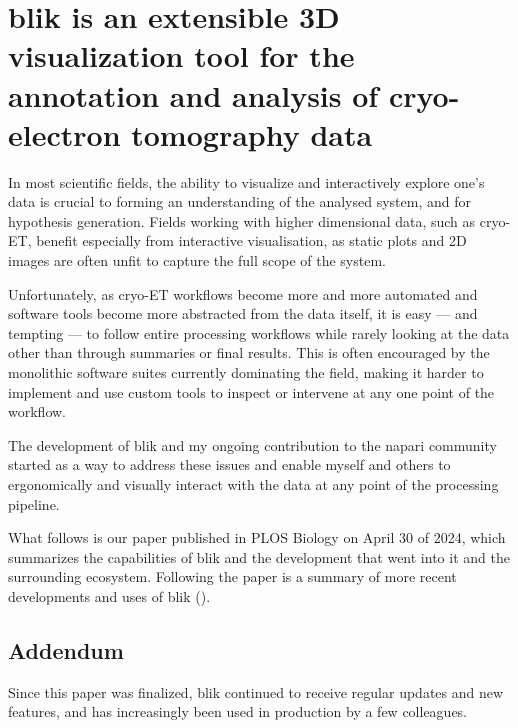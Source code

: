 \chapter[blik: a cryo-ET visualisation and analysis tool]{blik is an extensible 3D visualization tool for the annotation and analysis of cryo-electron tomography data}\label{blik}

In most scientific fields, the ability to visualize and interactively explore one's data is crucial to forming an understanding of the analysed system, and for hypothesis generation.
Fields working with higher dimensional data, such as cryo-ET, benefit especially from interactive visualisation, as static plots and 2D images are often unfit to capture the full scope of the system.

Unfortunately, as cryo-ET workflows become more and more automated and software tools become more abstracted from the data itself, it is easy --- and tempting --- to follow entire processing workflows while rarely looking at the data other than through summaries or final results.
This is often encouraged by the monolithic software suites currently dominating the field, making it harder to implement and use custom tools to inspect or intervene at any one point of the workflow.

The development of blik and my ongoing contribution to the napari community~\cite{thenaparicommunityNapariMultidimensionalImage2024} started as a way to address these issues and enable myself and others to ergonomically and visually interact with the data at any point of the processing pipeline.

What follows is our paper published in PLOS Biology on April 30 of 2024, which summarizes the capabilities of blik and the development that went into it and the surrounding ecosystem.
Following the paper is a summary of more recent developments and uses of blik ().

\localtableofcontents  %



\section{Addendum}\label{blik_addendum}

Since this paper was finalized, blik continued to receive regular updates and new features, and has increasingly been used in production by a few colleagues.

